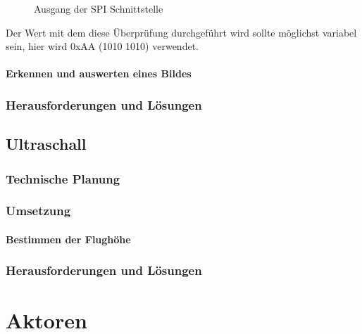     \begin{figure}[tbh]
      \begin{centering}
      \par\end{centering}
      \caption{Ausgang der SPI Schnittstelle}
      \label{SPI-Ausgang}
    \end{figure}

    Der Wert mit dem diese Überprüfung durchgeführt wird sollte möglichst variabel sein, hier wird 0xAA (1010 1010) verwendet.

    \subsubsection{Erkennen und auswerten eines Bildes}

  \subsection{Herausforderungen und Lösungen}

\section{Ultraschall}

  \subsection{Technische Planung}

  \subsection{Umsetzung}

    \subsubsection{Bestimmen der Flughöhe}

  \subsection{Herausforderungen und Lösungen}

\chapter{Aktoren}
\renewcommand{\kapitelautor}{Autor: Lucas Ullrich}

